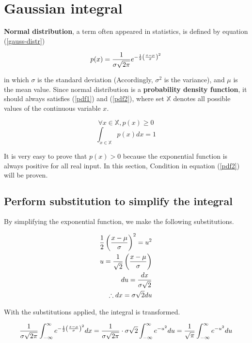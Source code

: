 \section{Gaussian integral}

\textbf{Normal distribution}, a term often appeared in statistics, is defined
by equation (\ref{gauss-distr})

\begin{equation}
	p(x)={1\over\sigma\sqrt{2\pi}}
	e^{-\frac12\left(x-\mu\over\sigma\right)^2}
	\label{gauss-distr}
\end{equation}

in which $\sigma$ is the standard deviation (Accordingly, $\sigma^2$ is the
variance), and $\mu$ is the mean value. Since normal distribution is a
\textbf{probability density function}, it should always satisfies (\ref{pdf1})
and (\ref{pdf2}), where set $\mathbb{X}$ denotes all possible values of the
continuous variable $x$.

\begin{equation}
	\forall x\in\mathbb{X},p(x)\ge0
	\label{pdf1}
\end{equation}
\begin{equation}
	\int_{x\in\mathbb{X}} p(x)dx=1
	\label{pdf2}
\end{equation}

It is very easy to prove that $p(x)>0$ because the exponential function is
always positive for all real input. In this section, Condition in equation
(\ref{pdf2}) will be proven.

\subsection{Perform substitution to simplify the integral}

By simplifying the exponential function, we make the following substitutions.

$$
\begin{aligned}
	\frac12\left(x-\mu\over\sigma\right)^2=u^2 \\
	u={1\over\sqrt2}\left(x-\mu\over\sigma\right) \\
	du={dx\over\sigma\sqrt2} \\
	\therefore dx=\sigma\sqrt2du
\end{aligned}
$$

With the substitutions applied, the integral is transformed.

\begin{equation}
	{1\over\sigma\sqrt{2\pi}}\int_{-\infty}^\infty
	e^{-\frac12\left(x-\mu\over\sigma\right)^2}dx=
	{1\over\sigma\sqrt{2\pi}}\cdot\sigma\sqrt2\int_{-\infty}^\infty
	e^{-u^2}du
	={1\over\sqrt\pi}\int_{-\infty}^\infty e^{-u^2}du
	\label{gauss-distr-int}
\end{equation}

